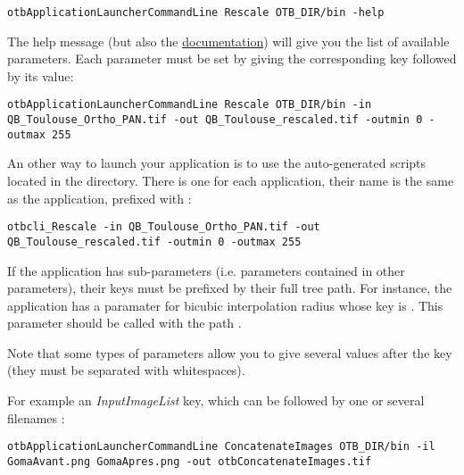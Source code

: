 \begin{lstlisting}[breaklines]
otbApplicationLauncherCommandLine Rescale OTB_DIR/bin -help
\end{lstlisting}

The help message (but also the \href{http://orfeo-toolbox.org/Applications}{documentation})
will give you the list of available parameters. Each parameter must be set by giving the 
corresponding key followed by its value:

\begin{lstlisting}[breaklines]
otbApplicationLauncherCommandLine Rescale OTB_DIR/bin -in QB_Toulouse_Ortho_PAN.tif -out QB_Toulouse_rescaled.tif -outmin 0 -outmax 255
\end{lstlisting}

An other way to launch your application is to use the auto-generated scripts located in the 
 directory. There is one for each application, their name is the same as 
the application, prefixed with :

\begin{lstlisting}[breaklines]
otbcli_Rescale -in QB_Toulouse_Ortho_PAN.tif -out QB_Toulouse_rescaled.tif -outmin 0 -outmax 255
\end{lstlisting}

If the application has sub-parameters (i.e. parameters contained in other parameters), 
their keys must be prefixed by their full tree path. For instance, the application 
 has a paramater for bicubic interpolation radius whose key is .
This parameter should be called with the path .

Note that some types of parameters allow you to give several values after the key (they must
be separated with whitespaces).

For example an \emph{InputImageList} key, which can be followed by one or several filenames :

\begin{lstlisting}[breaklines]
otbApplicationLauncherCommandLine ConcatenateImages OTB_DIR/bin -il GomaAvant.png GomaApres.png -out otbConcatenateImages.tif
\end{lstlisting}



